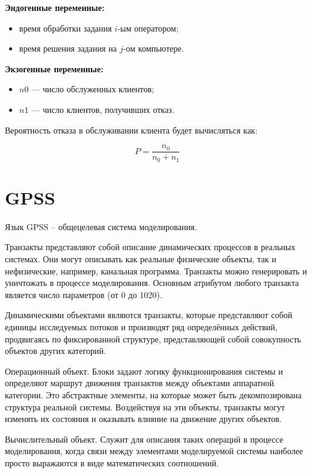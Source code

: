 \textbf{Эндогенные переменные:}

\begin{itemize}
	\item время обработки задания $i$-ым оператором;
	\item время решения задания на $j$-ом компьютере.
\end{itemize}

\textbf{Экзогенные переменные:}

\begin{itemize}
	\item $n0$ — число обслуженных клиентов;
	\item $n1$ — число клиентов, получивших отказ.
\end{itemize}

Вероятность отказа в обслуживании клиента будет вычисляться как:

\begin{equation}
	P = \frac{n_0}{n_0 + n_1}
\end{equation}

\section{GPSS}

Язык GPSS – общецелевая система моделирования.

Транзакты представляют собой описание динамических процессов в
реальных системах. Они могут описывать как реальные физические объекты,
так и нефизические, например, канальная программа. Транзакты можно
генерировать и уничтожать в процессе моделирования. Основным атрибутом
любого транзакта является число параметров (от 0 до 1020).

Динамическими объектами являются транзакты, которые представляют собой единицы исследуемых потоков и производят ряд определённых
действий, продвигаясь по фиксированной структуре, представляющей собой
совокупность объектов других категорий.

Операционный объект. Блоки задают логику функционирования
системы и определяют маршрут движения транзактов между объектами
аппаратной категории. Это абстрактные элементы, на которые может быть
декомпозирована структура реальной системы. Воздействуя на эти объекты,
транзакты могут изменять их состояния и оказывать влияние на движение
других объектов.

Вычислительный объект. Служит для описания таких операций
в процессе моделирования, когда связи между элементами моделируемой
системы наиболее просто выражаются в виде математических соотношений.


